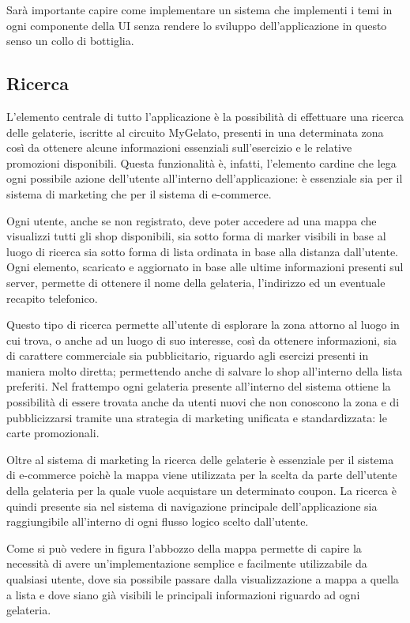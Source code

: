 Sarà importante capire come implementare un sistema che implementi i temi in ogni componente della UI senza rendere lo sviluppo dell'applicazione in questo senso un collo di bottiglia.



\subsection{Ricerca}
L'elemento centrale di tutto l'applicazione è la possibilità di effettuare una ricerca delle gelaterie, iscritte al circuito MyGelato, presenti in una determinata zona così da ottenere alcune informazioni essenziali sull'esercizio e le relative promozioni disponibili.
Questa funzionalità è, infatti, l'elemento cardine che lega ogni possibile azione dell'utente all'interno dell'applicazione: è essenziale sia per il sistema di marketing che per il sistema di e-commerce.

Ogni utente, anche se non registrato, deve poter accedere ad una mappa che visualizzi tutti gli shop disponibili, sia sotto forma di marker visibili in base al luogo di ricerca sia sotto forma di lista ordinata in base alla distanza dall'utente.
Ogni elemento, scaricato e aggiornato in base alle ultime informazioni presenti sul server, permette di ottenere il nome della gelateria, l'indirizzo ed un eventuale recapito telefonico.

Questo tipo di ricerca permette all'utente di esplorare la zona attorno al luogo in cui trova, o anche ad un luogo di suo interesse, così da ottenere informazioni, sia di carattere commerciale sia pubblicitario, riguardo agli esercizi presenti in maniera molto diretta; permettendo anche di salvare lo shop all'interno della lista preferiti.
Nel frattempo ogni gelateria presente all'interno del sistema ottiene la possibilità di essere trovata anche da utenti nuovi che non conoscono la zona e di pubblicizzarsi tramite una strategia di marketing unificata e standardizzata: le carte promozionali.

Oltre al sistema di marketing la ricerca delle gelaterie è essenziale per il sistema di e-commerce poichè la mappa viene utilizzata per la scelta da parte dell'utente della gelateria per la quale vuole acquistare un determinato coupon.
La ricerca è quindi presente sia nel sistema di navigazione principale dell'applicazione sia raggiungibile all'interno di ogni flusso logico scelto dall'utente.

Come si può vedere in figura l'abbozzo della mappa permette di capire la necessità di avere un'implementazione semplice e facilmente utilizzabile da qualsiasi utente, dove sia possibile passare dalla visualizzazione a mappa a quella a lista e dove siano già visibili le principali informazioni riguardo ad ogni gelateria.



